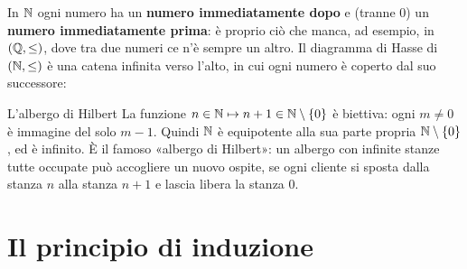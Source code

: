 \begin{spiegazione}
    In $\mathbb{N}$ ogni numero ha un \textbf{numero immediatamente dopo} e (tranne $0$) un \textbf{numero immediatamente prima}: è
    proprio ciò che manca, ad esempio, in $(\mathbb{Q}, \leq)$, dove tra due numeri ce n'è sempre un altro. Il diagramma di Hasse di
    $(\mathbb{N}, \leq)$ è una catena infinita verso l'alto, in cui ogni numero è coperto dal suo successore:
    \begin{center}
    \end{center}
\end{spiegazione}

\begin{esempio}{L'albergo di Hilbert}\label{es:hilbert}
    La funzione $n \in \mathbb{N} \mapsto n + 1 \in \mathbb{N} \setminus \{0\}$ è biettiva: ogni $m \neq 0$ è immagine del solo $m - 1$. Quindi
    $\mathbb{N}$ è equipotente alla sua parte propria $\mathbb{N} \setminus \{0\}$, ed è infinito. È il famoso «albergo di Hilbert»: un albergo
    con infinite stanze tutte occupate può accogliere un nuovo ospite, se ogni cliente si sposta dalla stanza $n$ alla stanza $n + 1$
    e lascia libera la stanza $0$.
\end{esempio}

\section{Il principio di induzione}\label{sec:induzione}

